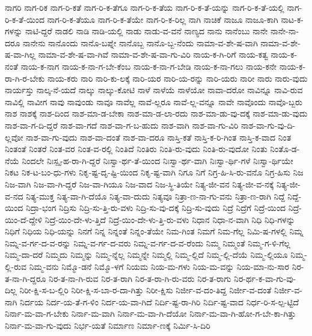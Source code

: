 {ನಾಗರಿ
ನಾಗ-ರಿಕ
ನಾಗ-ರಿ-ಕತೆ
ನಾಗ-ರಿ-ಕ-ತೆಗೂ
ನಾಗ-ರಿ-ಕ-ತೆಯ
ನಾಗ-ರಿ-ಕ-ತೆ-ಯನ್ನು
ನಾಗ-ರಿ-ಕ-ತೆ-ಯಲ್ಲಿ
ನಾಗ-ರಿ-ಕ-ತೆ-ಯಿಂದ
ನಾಗ-ರಿ-ಕ-ತೆಯೂ
ನಾಗ-ರಿ-ಕ-ತೆಯೇ
ನಾಗ-ರಿ-ಕ-ರಿಲ್ಲ
ನಾಗಿ
ನಾಚಿಕೆ
ನಾಜೂ
ನಾಜೂ-ಕಾಗಿ
ನಾಟ-ಕ-ಗಳನ್ನು
ನಾಟಿ-ದ್ದರೆ
ನಾಡಲಿ
ನಾಡಿ
ನಾಡಿ-ಯಲ್ಲಿ
ನಾಡು
ನಾಡು-ವ-ವನೆ
ನಾಣ್ಯದ
ನಾನು
ನಾನೆಂಬು
ನಾನೇ
ನಾನೇ-ನಾ-ದರೂ
ನಾನೇನು
ನಾನೊಂದು
ನಾನೊ-ಬಪ್ನೇ
ನಾನೊಬ್ಬ
ನಾನೊ-ಬ್ಬ-ನೆಂದು
ನಾಮಾ-ವ-ಶೇ-ಷ-ವಾಗಿ
ನಾಮಾ-ವ-ಶೇ-ಷ-ವಾ-ಗಿಲ್ಲ
ನಾಮಾ-ವ-ಶೇ-ಷ-ವಾ-ಗಿವೆ
ನಾಮಾ-ವ-ಶೇ-ಷ-ವಾ-ಗು-ವಿರಿ
ನಾಯ-ಕ-ಗಿ-ರಿಗೆ
ನಾಯ-ಕತ್ವ
ನಾಯ-ಕ-ನಂತೆ
ನಾಯ-ಕ-ನಾಗ
ನಾಯ-ಕ-ನಾ-ಗ-ಬೇ-ಕೆಂಬ
ನಾಯ-ಕ-ನಾ-ಗ-ಬೇಡಿ
ನಾಯ-ಕ-ನಾ-ಗಲು
ನಾಯ-ಕನೇ
ನಾಯ-ಕ-ರಾ-ಗಿ-ರ-ಬೇಕು
ನಾಯ-ಕರು
ನಾರಿ
ನಾರಿ-ಕು-ಲಕ್ಕೆ
ನಾರಿ-ಯರ
ನಾರಿ-ಯ-ರನ್ನು
ನಾರಿ-ಯರು
ನಾರೀ
ನಾರು
ನಾರು-ವುದು
ನಾರ್ಯಸ್ತು
ನಾಲ್ಕ-ನೆ-ಯದೆ
ನಾಲ್ಕು
ನಾಲ್ಕು-ಕೋಟಿ
ನಾಳೆ
ನಾಳೆಯೆ
ನಾಳೆಯೋ
ನಾವಾ-ದರೋ
ನಾವಿನ್ನೂ
ನಾವಿ-ರುವ
ನಾವಿಲ್ಲಿ
ನಾವೀಗ
ನಾವು
ನಾವುಂಡು
ನಾವೂ
ನಾವೆಲ್ಲ
ನಾವೆ-ಲ್ಲರೂ
ನಾವೆ-ಲ್ಲ-ವನ್ನೂ
ನಾವೇ
ನಾವೊಂದು
ನಾವೊ-ಬ್ಬರು
ನಾಶ
ನಾಶಕ್ಕೆ
ನಾಶ-ದಿಂದ
ನಾಶ-ಮಾ-ಡ-ಬೇಕಾ
ನಾಶ-ಮಾ-ಡ-ಲಾ-ರದು
ನಾಶ-ಮಾ-ಡು-ವು-ದಕ್ಕೆ
ನಾಶ-ಮಾ-ಡು-ವುದು
ನಾಶ-ವಾ-ಗ-ದಿ-ದ್ದರೆ
ನಾಶ-ವಾ-ಗದೆ
ನಾಶ-ವಾ-ಗ-ಬ-ಹುದು
ನಾಶ-ವಾಗಿ
ನಾಶ-ವಾ-ಗು-ವಿರಿ
ನಾಶ-ವಾ-ಗು-ವು-ದಿ-ಲ್ಲವೋ
ನಾಶ-ವಾ-ಗು-ವುದು
ನಾಶ-ವಾ-ದಂತೆ
ನಾಶ-ವಾ-ದರೂ
ನಾಸ್ತಿ-ಕತೆ
ನಾಸ್ತಿ-ಕ-ರಿ-ಗಿಂತ
ನಾಸ್ತಿ-ಕ-ವಾದ
ನಿಂತ
ನಿಂತಂತೆ
ನಿಂತರೆ
ನಿಂತ-ವರ
ನಿಂತ-ವ-ರಲ್ಲಿ
ನಿಂತಿದೆ
ನಿಂತಿರು
ನಿಂತಿ-ರು-ವುದು
ನಿಂತಿ-ರು-ವುದೋ
ನಿಂತು
ನಿಂತೊ-ಡ-ನೆಯೆ
ನಿಂದಲೇ
ನಿಃಸ್ಪೃ-ಹ-ರಾ-ಗಿ-ದ್ದರೆ
ನಿಃಸ್ವಾ-ರ್ಥ-ತೆ-ಯಿಂದ
ನಿಃಸ್ವಾ-ರ್ಥ-ವಾಗಿ
ನಿಃಸ್ವಾ-ರ್ಥಿ-ಗಳೆ
ನಿಃಸ್ವಾ-ರ್ಥಿಯೇ
ನಿಕಟ
ನಿಕ-ಟ-ಬಂ-ಧು-ಗಳು
ನಿಕೃ-ಷ್ಟ-ದೃ-ಷ್ಟಿ-ಯಿಂದ
ನಿಕೃ-ಷ್ಟ-ವಾಗಿ
ನಿಗೂ
ನಿಗೆ
ನಿಗ್ರ-ಹಿ-ಸಿ-ರು-ವನೊ
ನಿಗ್ರ-ಹಿಸು
ನಿಜ
ನಿಜ-ವಾಗಿ
ನಿಜ-ವಾ-ಗಿ-ದ್ದರೆ
ನಿಜ-ವಾ-ಗಿಯೂ
ನಿಜ-ವಾದ
ನಿಜ-ಸ್ಥಿ-ತಿಯೇ
ನಿತ್ಯ-ಜೀ-ವನ
ನಿತ್ಯ-ಜೀ-ವ-ನಕ್ಕೆ
ನಿತ್ಯ-ಜೀ-ವ-ನದ
ನಿತ್ಯ-ಮುಕ್ತ
ನಿತ್ಯ-ವಾ-ಗಿ-ದೆಯೊ
ನಿತ್ಯ-ವಾ-ದುದು
ನಿತ್ಯವೂ
ನಿತ್ರಾ-ಣ-ನಾ-ಗು-ವನು
ನಿತ್ರಾ-ಣ-ರಾಗಿ
ನಿದ್ದೆ
ನಿದ್ದೆ-ಯಿಂದ
ನಿದ್ರಾ-ಭಂಗ
ನಿದ್ರಿಸು
ನಿದ್ರಿ-ಸು-ತ್ತಿ-ರು-ವಳು
ನಿದ್ರಿ-ಸು-ವು-ದಕ್ಕೆ
ನಿದ್ರಿ-ಸು-ವುದು
ನಿದ್ರೆ
ನಿದ್ರೆಗೆ
ನಿದ್ರೆ-ಯಿಂದ
ನಿದ್ರೆ-ಯಿಂ-ದೆ-ದ್ದೇಳಿ
ನಿದ್ರೆ-ಯಿಂ-ದೇ-ಳು-ತ್ತಿದೆ
ನಿದ್ರೆ-ಯಿಂ-ದೇ-ಳು-ತ್ತಿ-ರು-ವಳು
ನಿಧಾನ
ನಿಧಾ-ನ-ವಾಗಿ
ನಿಧಿ
ನಿಧಿ-ಗಳನ್ನು
ನಿಧಿಗೆ
ನಿಧಿಯ
ನಿಧಿ-ಯನ್ನು
ನಿನಗೆ
ನಿನ್ನ
ನಿನ್ನಂತೆ
ನಿನ್ನಂ-ತೆಯೇ
ನಿಮ-ಗಿಂತ
ನಿಮಗೆ
ನಿಮ-ಗೆಲ್ಲ
ನಿಮಿ-ಷ-ಗಳಲ್ಲಿ
ನಿಮ್ನ
ನಿಮ್ನ-ವ-ರ್ಗ-ದ-ವ-ರನ್ನು
ನಿಮ್ನ-ವ-ರ್ಗ-ದ-ವರು
ನಿಮ್ನ-ವ-ರ್ಗ-ದ-ವ-ರೆಂದು
ನಿಮ್ಮ
ನಿಮ್ಮಂತೆ
ನಿಮ್ಮ-ಗ-ಳಿ-ಗೆಲ್ಲ
ನಿಮ್ಮ-ದಾ-ದರೆ
ನಿಮ್ಮದು
ನಿಮ್ಮನ್ನು
ನಿಮ್ಮ-ನ್ನೆಲ್ಲ
ನಿಮ್ಮನ್ನೇ
ನಿಮ್ಮಲ್ಲಿ
ನಿಮ್ಮ-ಲ್ಲಿದೆ
ನಿಮ್ಮ-ಲ್ಲಿ-ದೆಯೆ
ನಿಮ್ಮ-ಲ್ಲಿಯೂ
ನಿಮ್ಮ-ಲ್ಲಿ-ರುವ
ನಿಮ್ಮ-ವನು
ನಿಮ್ಮೊ-ಡನೆ
ನಿಮ್ಮೊ-ಳಗೆ
ನಿಯಮ
ನಿಯ-ಮ-ಗಳು
ನಿಯ-ಮ-ವನ್ನು
ನಿಯ-ಮಾ-ನು-ಸಾರ
ನಿರ-ತ-ನಾ-ಗಿ-ದ್ದರೂ
ನಿರ-ತ-ನಾ-ಗಿ-ರುವ
ನಿರ-ತ-ರಾಗಿ
ನಿರ-ತ-ರಾ-ಗಿ-ರು-ವರು
ನಿರ-ತ-ರಾಗು
ನಿರ-ರ್ಥ-ಕ-ವಾ-ಗು-ವು-ದಿಲ್ಲ
ನಿರೀ-ಕ್ಷಿ-ಸ-ಬ-ಲ್ಲಿರಿ
ನಿರೀ-ಕ್ಷಿ-ಸ-ಬಾ-ರ-ದಾ-ಗಿತ್ತು
ನಿರೀ-ಕ್ಷಿಸು
ನಿರ್ಜೀ-ವ-ದಂ-ತಿದ್ದ
ನಿರ್ಜೀ-ವ-ದಂತೆ
ನಿರ್ಜೀ-ವ-ನಾಗಿ
ನಿರ್ದಯ
ನಿರ್ದ-ಯ-ತೆ-ಗ-ಳಿಂ
ನಿರ್ದ-ಯ-ವಾ-ಗಿದೆ
ನಿರ್ದಿ-ಷ್ಟ-ರಾ-ಗಿರಿ
ನಿರ್ದಿ-ಷ್ಟ-ವಾದ
ನಿರ್ಧ-ರಿ-ಸ-ಲ್ಪ-ಟ್ಟಿದೆ
ನಿರ್ನಾ-ಮ-ವಾ-ಗ-ಬೇಕು
ನಿರ್ನಾ-ಮ-ವಾಗಿ
ನಿರ್ನಾ-ಮ-ವಾ-ಗಿ-ದೆಯೋ
ನಿರ್ನಾ-ಮ-ವಾ-ಗಿ-ಹೋ-ಗ-ಬೇ-ಕಾ-ಗಿತ್ತು
ನಿರ್ನಾ-ಮ-ವಾ-ಗು-ವುದು
ನಿರ್ಭ-ಯತೆ
ನಿರ್ಮಾಣ
ನಿರ್ಮಾ-ಣಕ್ಕೆ
ನಿರ್ಮಿ-ಸಿ-ದಿರಿ
}
